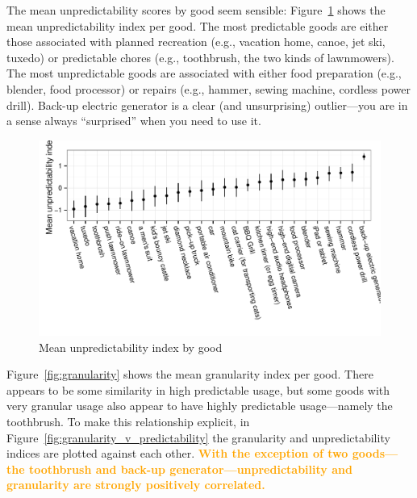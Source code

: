 \documentclass[11pt]{article}
\newcommand{\important}[1]{\textcolor{orange}{\textbf{#1}}}
\newcommand{\important}[1]{#1}
\begin{document}
The mean unpredictability scores by good seem sensible: 
Figure~\ref{fig:predict_index} shows the mean unpredictability index per good. 
The most predictable goods are either those associated with planned recreation (e.g., vacation home, canoe, jet ski, tuxedo) or predictable chores (e.g., toothbrush, the two kinds of lawnmowers). 
The most unpredictable goods are associated with either food preparation (e.g., blender, food processor) or repairs (e.g., hammer, sewing machine, cordless power drill). 
Back-up electric generator is a clear (and unsurprising) outlier---you are in a sense always ``surprised'' when you need to use it. 

\begin{figure}
\centering 
\caption{Mean unpredictability index by good \label{fig:predict_index} }
\begin{minipage}{0.90 \linewidth}
\includegraphics[width = \linewidth]{./plots/predictability.pdf} 
\end{minipage} 
\end{figure} 

Figure~\ref{fig:granularity} shows the mean granularity index per good. 
There appears to be some similarity in high predictable usage, but some goods with very granular usage also appear to have highly predictable usage---namely the toothbrush. 
To make this relationship explicit, in Figure~\ref{fig:granularity_v_predictability} the granularity and unpredictability indices are plotted against each other. 
\important{With the exception of two goods---the toothbrush and back-up generator---unpredictability and granularity are strongly positively correlated.}
\end{document}
